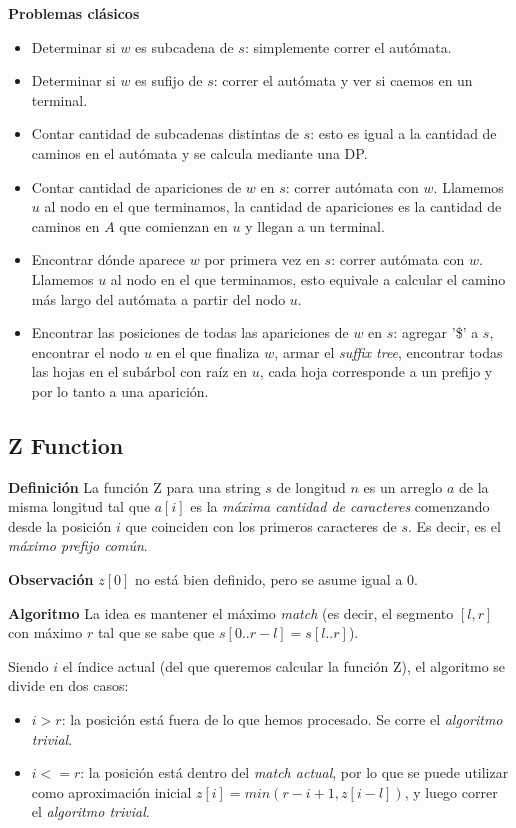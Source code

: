 \textbf{Problemas clásicos}
\begin{itemize}
    \item Determinar si $w$ es subcadena de $s$: simplemente correr el autómata.
    \item Determinar si $w$ es sufijo de $s$: correr el autómata y ver si caemos en un terminal.
    \item Contar cantidad de subcadenas distintas de $s$: esto es igual a la cantidad de
    caminos en el autómata y se calcula mediante una DP.
    \item Contar cantidad de apariciones de $w$ en $s$: correr autómata con $w$. Llamemos $u$
    al nodo en el que terminamos, la cantidad de apariciones es la cantidad de caminos 
    en $A$ que comienzan en $u$ y llegan a un terminal.
    \item Encontrar dónde aparece $w$ por primera vez en $s$: correr autómata con $w$. Llamemos $u$
    al nodo en el que terminamos, esto equivale a calcular el camino más largo del autómata 
    a partir del nodo $u$.
    \item Encontrar las posiciones de todas las apariciones de $w$ en $s$: agregar '\$' a $s$,
    encontrar el nodo $u$ en el que finaliza $w$, armar el \emph{suffix tree}, encontrar
    todas las hojas en el subárbol con raíz en $u$, cada hoja corresponde a un prefijo
    y por lo tanto a una aparición.
\end{itemize}
\subsection{Z Function}
\textbf{Definición}
La función Z para una string $s$ de longitud $n$ es un arreglo $a$ de la misma longitud
tal que $a[i]$ es la \emph{máxima cantidad de caracteres} comenzando desde la posición $i$
que coinciden con los primeros caracteres de $s$. Es decir, es el \emph{máximo prefijo común}.

\textbf{Observación}
$z[0]$ no está bien definido, pero se asume igual a $0$.

\textbf{Algoritmo}
La idea es mantener el máximo \emph{match} (es decir, el segmento $[l, r]$ con
máximo $r$ tal que se sabe que $s[0..r-l] = s[l..r]$). 

Siendo $i$ el índice actual (del que queremos calcular la función Z), el algoritmo 
se divide en dos casos:
\begin{itemize}
    \item $i > r$: la posición está fuera de lo que hemos procesado. Se corre el
    \emph{algoritmo trivial}.
    \item $i <= r$: la posición está dentro del \emph{match actual}, por lo que
    se puede utilizar como aproximación inicial $z[i] = min(r - i + 1, z[i-l])$,
    y luego correr el \emph{algoritmo trivial}.
\end{itemize}

